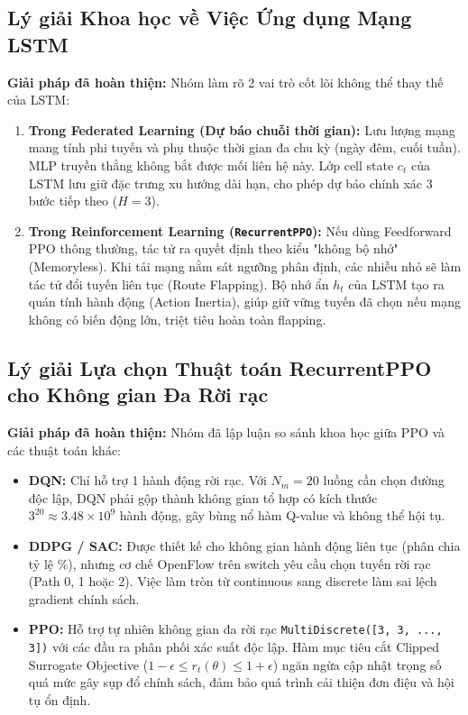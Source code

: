 \documentclass[11pt,a4paper]{article}
\begin{document}
\subsection{Lý giải Khoa học về Việc Ứng dụng Mạng LSTM}
\textbf{Giải pháp đã hoàn thiện:} Nhóm làm rõ 2 vai trò cốt lõi không thể thay thế của LSTM:
\begin{enumerate}
    \item \textbf{Trong Federated Learning (Dự báo chuỗi thời gian):} Lưu lượng mạng mang tính phi tuyến và phụ thuộc thời gian đa chu kỳ (ngày đêm, cuối tuần). MLP truyền thẳng không bắt được mối liên hệ này. Lớp cell state $c_t$ của LSTM lưu giữ đặc trưng xu hướng dài hạn, cho phép dự báo chính xác 3 bước tiếp theo ($H=3$).
    \item \textbf{Trong Reinforcement Learning (\texttt{RecurrentPPO}):} Nếu dùng Feedforward PPO thông thường, tác tử ra quyết định theo kiểu "không bộ nhớ" (Memoryless). Khi tải mạng nằm sát ngưỡng phân định, các nhiễu nhỏ sẽ làm tác tử đổi tuyến liên tục (Route Flapping). Bộ nhớ ẩn $h_t$ của LSTM tạo ra quán tính hành động (Action Inertia), giúp giữ vững tuyến đã chọn nếu mạng không có biến động lớn, triệt tiêu hoàn toàn flapping.
\end{enumerate}

\subsection{Lý giải Lựa chọn Thuật toán RecurrentPPO cho Không gian Đa Rời rạc}
\textbf{Giải pháp đã hoàn thiện:} Nhóm đã lập luận so sánh khoa học giữa PPO và các thuật toán khác:
\begin{itemize}
    \item \textbf{DQN:} Chỉ hỗ trợ 1 hành động rời rạc. Với $N_m=20$ luồng cần chọn đường độc lập, DQN phải gộp thành không gian tổ hợp có kích thước $3^{20} \approx 3.48 \times 10^9$ hành động, gây bùng nổ hàm Q-value và không thể hội tụ.
    \item \textbf{DDPG / SAC:} Được thiết kế cho không gian hành động liên tục (phân chia tỷ lệ \%), nhưng cơ chế OpenFlow trên switch yêu cầu chọn tuyến rời rạc (Path 0, 1 hoặc 2). Việc làm tròn từ continuous sang discrete làm sai lệch gradient chính sách.
    \item \textbf{PPO:} Hỗ trợ tự nhiên không gian đa rời rạc \texttt{MultiDiscrete([3, 3, ..., 3])} với các đầu ra phân phối xác suất độc lập. Hàm mục tiêu cắt Clipped Surrogate Objective ($1-\epsilon \le r_t(\theta) \le 1+\epsilon$) ngăn ngừa cập nhật trọng số quá mức gây sụp đổ chính sách, đảm bảo quá trình cải thiện đơn điệu và hội tụ ổn định.
\end{itemize}
\end{document}
